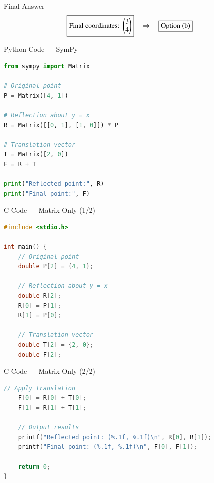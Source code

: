 \documentclass{beamer}
\begin{document}
\begin{frame}{Final Answer}
\[
\boxed{
\text{Final coordinates: } \begin{pmatrix}3 \\ 4\end{pmatrix}
}
\quad \Rightarrow \quad \boxed{\text{Option (b)}}
\]
\end{frame}

\begin{frame}[fragile]{Python Code — SymPy}
\begin{lstlisting}[language=Python]
from sympy import Matrix

# Original point
P = Matrix([4, 1])

# Reflection about y = x
R = Matrix([[0, 1], [1, 0]]) * P

# Translation vector
T = Matrix([2, 0])
F = R + T

print("Reflected point:", R)
print("Final point:", F)
\end{lstlisting}
\end{frame}

\begin{frame}[fragile]{C Code — Matrix Only (1/2)}
\begin{lstlisting}[language=C]
#include <stdio.h>

int main() {
    // Original point
    double P[2] = {4, 1};

    // Reflection about y = x
    double R[2];
    R[0] = P[1];
    R[1] = P[0];

    // Translation vector
    double T[2] = {2, 0};
    double F[2];
\end{lstlisting}
\end{frame}

\begin{frame}[fragile]{C Code — Matrix Only (2/2)}
\begin{lstlisting}[language=C]
    // Apply translation
    F[0] = R[0] + T[0];
    F[1] = R[1] + T[1];

    // Output results
    printf("Reflected point: (%.1f, %.1f)\n", R[0], R[1]);
    printf("Final point: (%.1f, %.1f)\n", F[0], F[1]);

    return 0;
}
\end{lstlisting}
\end{frame}
\end{document}
